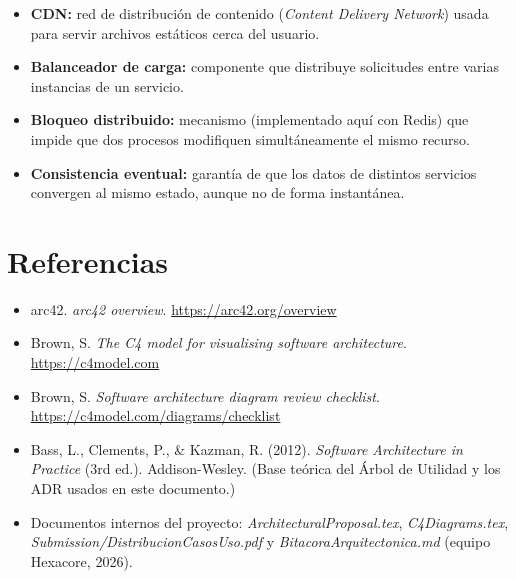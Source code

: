 \documentclass[11pt,a4paper]{article}
\begin{document}
\begin{itemize}
\item \textbf{CDN:} red de distribución de contenido (\textit{Content Delivery Network}) usada
para servir archivos estáticos cerca del usuario.
\item \textbf{Balanceador de carga:} componente que distribuye solicitudes entre varias instancias
de un servicio.
\item \textbf{Bloqueo distribuido:} mecanismo (implementado aquí con Redis) que impide que dos
procesos modifiquen simultáneamente el mismo recurso.
\item \textbf{Consistencia eventual:} garantía de que los datos de distintos servicios convergen
al mismo estado, aunque no de forma instantánea.
\end{itemize}

\section{Referencias}
\label{sec:referencias}

\begin{itemize}
\item arc42. \textit{arc42 overview}. \url{https://arc42.org/overview}
\item Brown, S. \textit{The C4 model for visualising software architecture}.
\url{https://c4model.com}
\item Brown, S. \textit{Software architecture diagram review checklist}.
\url{https://c4model.com/diagrams/checklist}
\item Bass, L., Clements, P., \& Kazman, R. (2012). \textit{Software Architecture in Practice}
(3rd ed.). Addison-Wesley. (Base teórica del Árbol de Utilidad y los ADR usados en este
documento.)
\item Documentos internos del proyecto: \textit{ArchitecturalProposal.tex},
\textit{C4Diagrams.tex}, \textit{Submission/DistribucionCasosUso.pdf} y
\textit{BitacoraArquitectonica.md} (equipo Hexacore, 2026).
\end{itemize}
\end{document}
